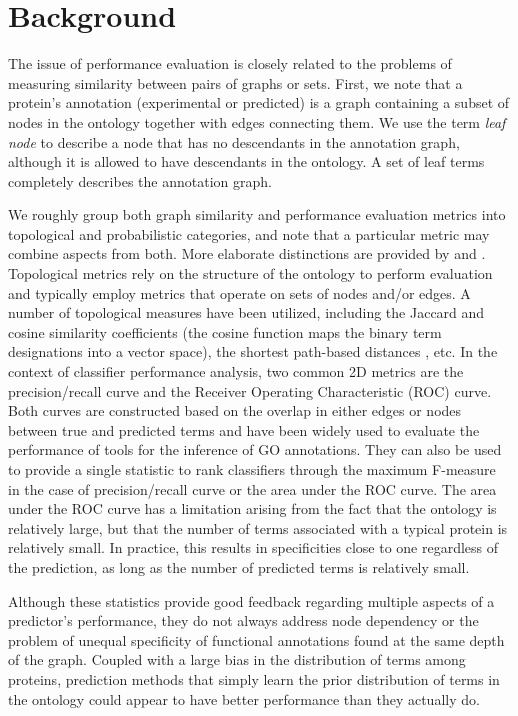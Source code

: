  

\section{Background}
The issue of performance evaluation is closely related to the problems of measuring similarity between pairs of graphs or sets. First, we note that a protein's annotation (experimental or predicted) is a graph containing a subset of nodes in the ontology together with edges connecting them. We use the term \emph{leaf node} to describe a node that has no descendants in the annotation graph, although it is allowed to have descendants in the ontology. A set of leaf terms completely describes the annotation graph. %


We roughly group both graph similarity and performance evaluation metrics into topological and probabilistic categories, and note that a particular metric may combine aspects from both. More elaborate distinctions are provided by \cite{Pesquita2009} and \cite{Guzzi2012}. Topological metrics rely on the structure of the ontology to perform evaluation and typically employ metrics that operate on sets of nodes and/or edges. A number of topological measures have been utilized, including the Jaccard and cosine similarity coefficients (the cosine function maps the binary term designations into a vector space), the shortest path-based distances \citep{Rada1989}, etc. In the context of classifier performance analysis, two common 2D metrics are the precision/recall curve and the Receiver Operating Characteristic (ROC) curve. Both curves are constructed based on the overlap in either edges or nodes between true and predicted terms and have been widely used to evaluate the performance of tools for the inference of GO annotations. They can also be used to provide a single statistic to rank classifiers through the maximum F-measure in the case of precision/recall curve or the area under the ROC curve. The area under the ROC curve has a limitation arising from the fact that the ontology is relatively large, but that the number of terms associated with a typical protein is relatively small. In practice, this results in specificities close to one regardless of the prediction, as long as the number of predicted terms is relatively small.

Although these statistics provide good feedback regarding multiple aspects of a predictor's performance, they do not always address node dependency or the problem of unequal specificity of functional annotations found at the same depth of the graph. Coupled with a large bias in the distribution of terms among proteins, prediction methods that simply learn the prior distribution of terms in the ontology could appear to have better performance than they actually do.

